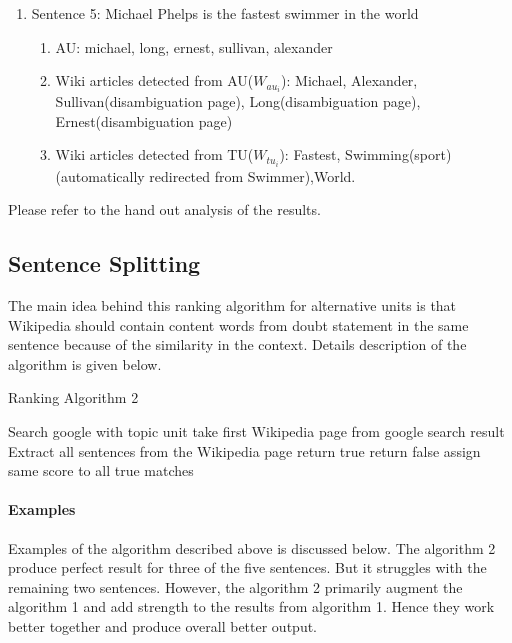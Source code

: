 \documentclass[11pt]{article}
\begin{document}
\begin{enumerate}
\begin{enumerate}
\end{enumerate}


\item Sentence 5: Michael Phelps is the fastest swimmer in the world
\begin{enumerate}
\item AU: michael, long, ernest, sullivan, alexander
\item Wiki articles detected from AU($W_{au_{i}}$): Michael, Alexander, Sullivan(disambiguation page), Long(disambiguation page), Ernest(disambiguation page) 
\item Wiki articles detected from TU($W_{tu_{i}}$): Fastest, Swimming(sport) (automatically redirected from Swimmer),World.

\end{enumerate}


\end{enumerate}

Please refer to the hand out analysis of the results.


\subsection{Sentence Splitting}

The main idea behind this ranking algorithm for alternative units is that Wikipedia should contain content words from doubt statement in the same sentence because of the similarity in the context. Details description of the algorithm is given below.


\begin{algorithm}
\small
\caption{Ranking Algorithm 2}
\label{alg:AssignScore} 
\begin{algorithmic}
\STATE Search google with topic unit
\STATE take first Wikipedia page from google search result
\STATE Extract all sentences from the Wikipedia page
				\STATE return true
			\ELSE
				\STATE return false	
			\ENDIF
		\ENDIF
	\ENDFOR
\ENDFOR		
\STATE assign same score to all true matches

\end{algorithmic}
\end{algorithm}

\paragraph{Examples}
Examples of the algorithm described above is discussed below. The algorithm 2 produce perfect result for three of the five sentences. But it struggles with the remaining two sentences. However, the algorithm 2 primarily augment the algorithm 1 and add strength to the results from algorithm 1. Hence they work better together and produce overall better output.
\end{document}
